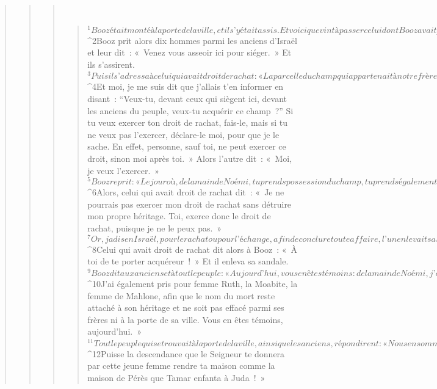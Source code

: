 \begin{verse}
\begin{verse}
\begin{verse}
         
      \bchapter{}
      \begin{verse}
${}^{1}Booz était monté à la porte de la ville, et il s’y était assis. Et voici que vint à passer celui dont Booz avait parlé, celui qui avait droit de rachat. Booz l’appela : « Hé, toi ! Arrête-toi un peu, viens t’asseoir ici ! » Il s’arrêta et il s’assit. 
${}^{2}Booz prit alors dix hommes parmi les anciens d’Israël et leur dit : « Venez vous asseoir ici pour siéger. » Et ils s’assirent. 
${}^{3}Puis il s’adressa à celui qui avait droit de rachat : « La parcelle du champ qui appartenait à notre frère Élimélek, Noémi, qui vient de revenir des Champs-de-Moab, la met en vente. 
${}^{4}Et moi, je me suis dit que j’allais t’en informer en disant : “Veux-tu, devant ceux qui siègent ici, devant les anciens du peuple, veux-tu acquérir ce champ ?” Si tu veux exercer ton droit de rachat, fais-le, mais si tu ne veux pas l’exercer, déclare-le moi, pour que je le sache. En effet, personne, sauf toi, ne peut exercer ce droit, sinon moi après toi. » Alors l’autre dit : « Moi, je veux l’exercer. » 
${}^{5}Booz reprit : « Le jour où, de la main de Noémi, tu prends possession du champ, tu prends également possession de Ruth la Moabite, la femme de celui qui est mort, afin que le nom du mort reste attaché à son héritage. » 
${}^{6}Alors, celui qui avait droit de rachat dit : « Je ne pourrais pas exercer mon droit de rachat sans détruire mon propre héritage. Toi, exerce donc le droit de rachat, puisque je ne le peux pas. »
${}^{7}Or, jadis en Israël, pour le rachat ou pour l’échange, afin de conclure toute affaire, l’un enlevait sa sandale et la donnait à l’autre. En Israël, cela servait de témoignage. 
${}^{8}Celui qui avait droit de rachat dit alors à Booz : « À toi de te porter acquéreur ! » Et il enleva sa sandale. 
${}^{9}Booz dit aux anciens et à tout le peuple : « Aujourd’hui, vous en êtes témoins : de la main de Noémi, j’ai pris possession de tout ce qui appartenait à Élimélek ainsi qu’à Kilyone et Mahlone. 
${}^{10}J’ai également pris pour femme Ruth, la Moabite, la femme de Mahlone, afin que le nom du mort reste attaché à son héritage et ne soit pas effacé parmi ses frères ni à la porte de sa ville. Vous en êtes témoins, aujourd’hui. » 
${}^{11}Tout le peuple qui se trouvait à la porte de la ville, ainsi que les anciens, répondirent : « Nous en sommes témoins. Que le Seigneur rende la femme qui entre dans ta maison comme Rachel et comme Léa qui, à elles deux, ont bâti la maison d’Israël !
      Fais fortune en Éphrata !
      Fais-toi un nom à Bethléem !
${}^{12}Puisse la descendance que le Seigneur te donnera par cette jeune femme rendre ta maison comme la maison de Pérès que Tamar enfanta à Juda ! »

\end{verse}
\end{verse}
\end{verse}
\end{verse}
